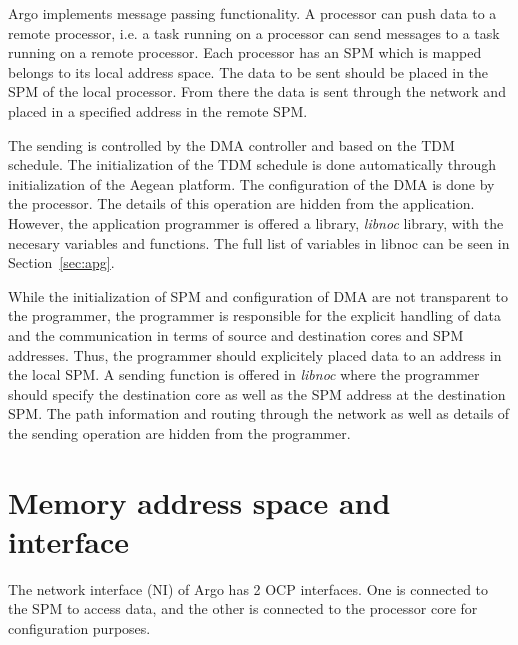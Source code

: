 \documentclass[a4paper,fontsize=10pt,twoside,DIV15,BCOR12mm,headinclude=true,footinclude=false,pagesize,bibtotoc]{scrbook}
\newcommand{\code}[1]{{\texttt{#1}}}
\begin{document}
Argo implements message passing functionality. A processor can push data 
to a remote processor, i.e. a task running on a processor
can send messages to a task running on a remote processor.
Each processor has an SPM which is mapped belongs to its local address space.
The data to be sent should be placed in the SPM of the local processor.
From there the data is sent through the network and placed in a 
specified address in the remote SPM. 

The sending is controlled by the DMA controller and based on the TDM schedule.
The initialization of the TDM schedule is done automatically through initialization 
of the Aegean platform. The configuration of the DMA is done by the processor.
The details of this operation are hidden from the application. However,
the application programmer is offered a library, \textit{libnoc} library,
with the necesary variables and functions. 
The full list of variables in libnoc can be seen in Section~\ref{sec:apg}.

While the initialization of SPM and configuration of DMA are not transparent to the programmer,
the programmer is responsible for the explicit handling of data and the communication in terms of
source and destination cores and SPM addresses.
Thus, the programmer should explicitely placed data to an address in the local SPM.
A sending function is offered in \textit{libnoc} where the programmer should specify 
the destination core as well as the SPM address at the destination SPM. The path information
and routing through the network as well as details of the sending operation are hidden from the programmer.



\section{Memory address space and interface}
\label{sec:mem}

The network interface (NI) of Argo has 2 OCP \cite{ocp:spec} interfaces. One is connected to the SPM
to access data, and the other is connected to the processor core for configuration purposes.
\end{document}
